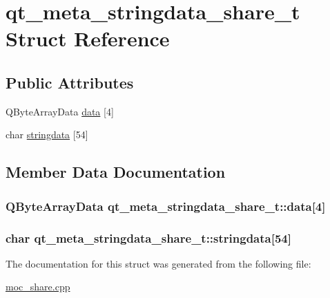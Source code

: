 \hypertarget{structqt__meta__stringdata__share__t}{\section{qt\-\_\-meta\-\_\-stringdata\-\_\-share\-\_\-t Struct Reference}
\label{structqt__meta__stringdata__share__t}
}
\subsection*{Public Attributes}
\begin{DoxyCompactItemize}
\item 
Q\-Byte\-Array\-Data \hyperlink{structqt__meta__stringdata__share__t_a092ef916b777098eca8a99c161baea4e}{data} \mbox{[}4\mbox{]}
\item 
char \hyperlink{structqt__meta__stringdata__share__t_a7dba9f74d4c67af31674fd7eaa351d9c}{stringdata} \mbox{[}54\mbox{]}
\end{DoxyCompactItemize}


\subsection{Member Data Documentation}
\hypertarget{structqt__meta__stringdata__share__t_a092ef916b777098eca8a99c161baea4e}{
\subsubsection[{data}]{\setlength{\rightskip}{0pt plus 5cm}Q\-Byte\-Array\-Data qt\-\_\-meta\-\_\-stringdata\-\_\-share\-\_\-t\-::data\mbox{[}4\mbox{]}}}\label{structqt__meta__stringdata__share__t_a092ef916b777098eca8a99c161baea4e}
\hypertarget{structqt__meta__stringdata__share__t_a7dba9f74d4c67af31674fd7eaa351d9c}{
\subsubsection[{stringdata}]{\setlength{\rightskip}{0pt plus 5cm}char qt\-\_\-meta\-\_\-stringdata\-\_\-share\-\_\-t\-::stringdata\mbox{[}54\mbox{]}}}\label{structqt__meta__stringdata__share__t_a7dba9f74d4c67af31674fd7eaa351d9c}


The documentation for this struct was generated from the following file\-:\begin{DoxyCompactItemize}
\item 
\hyperlink{moc__share_8cpp}{moc\-\_\-share.\-cpp}\end{DoxyCompactItemize}
